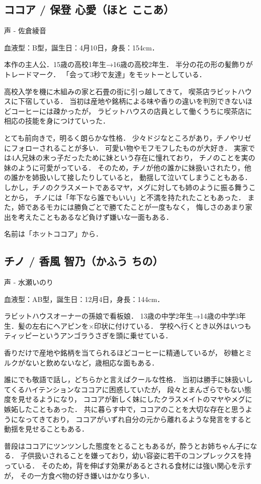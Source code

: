\documentclass[a4paper, 12pt, oneside, report, uplatex]{jsbook}
\begin{document}
    \subsection{ココア / 保登 心愛（ほと ここあ）}
    \label{sub:ココア}

    声 - 佐倉綾音

    血液型：B型，誕生日：4月10日，身長：154cm．

    本作の主人公．15歳の高校1年生→16歳の高校2年生．
    半分の花の形の髪飾りがトレードマーク．
    「会って3秒で友達」をモットーとしている．

    高校入学を機に木組みの家と石畳の街に引っ越してきて，
    喫茶店ラビットハウスに下宿している．
    当初は産地や銘柄による味や香りの違いを判別できないほどコーヒーには疎かったが，
    ラビットハウスの店員として働くうちに喫茶店に相応の技能を身につけていった．

    とても前向きで，明るく朗らかな性格．
    少々ドジなところがあり，チノやリゼにフォローされることが多い．
    可愛い物やモフモフしたものが大好き．
    実家では4人兄妹の末っ子だったために妹という存在に憧れており，
    チノのことを実の妹のように可愛がっている．
    そのため，チノが他の誰かに妹扱いされたり，他の誰かを姉扱いして接したりしていると，
    動揺して泣いてしまうこともある．
    しかし，チノのクラスメートであるマヤ，メグに対しても姉のように振る舞うことから，
    チノには「年下なら誰でもいい」と不満を持たれたこともあった．
    また，姉であるモカには勝負ごとで勝てたことが一度もなく，
    悔しさのあまり家出を考えたこともあるなど負けず嫌いな一面もある．

    名前は「ホットココア」から．

    \subsection{チノ / 香風 智乃（かふう ちの）}
    \label{sub:チノ}

    声 - 水瀬いのり

    血液型：AB型，誕生日：12月4日，身長：144cm．

    ラビットハウスオーナーの孫娘で看板娘．
    13歳の中学2年生→14歳の中学3年生．髪の左右にヘアピンを×印状に付けている．
    学校へ行くとき以外はいつもティッピーというアンゴラうさぎを頭に乗せている．

    香りだけで産地や銘柄を当てられるほどコーヒーに精通しているが，
    砂糖とミルクがないと飲めないなど，歳相応な面もある．

    誰にでも敬語で話し，どちらかと言えばクールな性格．
    当初は勝手に妹扱いしてくるハイテンションなココアに困惑していたが，
    段々とまんざらでもない態度を見せるようになり，
    ココアが新しく妹にしたクラスメイトのマヤやメグに嫉妬したこともあった．
    共に暮らす中で，ココアのことを大切な存在と思うようになってきており，
    ココアがいずれ自分の元から離れるような発言をすると動揺を見せることもある．

    普段はココアにツンツンした態度をとることもあるが，酔うとお姉ちゃん子になる．
    子供扱いされることを嫌っており，幼い容姿に若干のコンプレックスを持っている．
    そのため，背を伸ばす効果があるとされる食材には強い関心を示すが，
    その一方食べ物の好き嫌いはかなり多い．

    \nocite{*}
    
\end{document}
